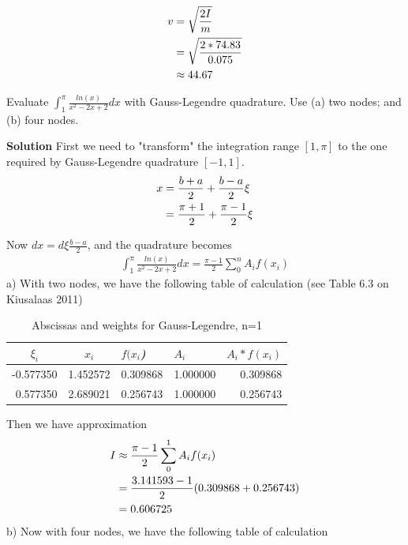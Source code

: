 \begin{exercise}{3}
 \begin{align}
 v&=\sqrt{\frac{2I}{m}} \notag \\
 &=\sqrt{\frac{2*74.83}{0.075}} \notag \\
 &\approx 44.67 \notag
 \end{align}
 \end{exercise}

\begin{exercise}{4} Evaluate $\int_1^\pi \frac{ln(x)}{x^2-2x+2}dx$
with Gauss-Legendre quadrature. Use (a) two nodes; and (b) four nodes.

\textbf{Solution}
First we need to "transform" the integration range \([1,\pi]\) to the one required by Gauss-Legendre quadrature \([-1,1]\).
\begin{align}
x&=\frac{b+a}{2} + \frac{b-a}{2}\xi \notag \\
&=\frac{\pi+1}{2} + \frac{\pi-1}{2}\xi \notag
\end{align}
\end{exercise}
Now \(dx = d\xi \frac{b-a}{2}\), and the quadrature becomes
\begin{align}
\int_1^\pi \frac{ln(x)}{x^2-2x+2}dx = \frac{\pi-1}{2} \sum_0^n A_if(x_i)
\end{align}
a) With two nodes, we have the following table of calculation (see Table 6.3 on Kiusalaas 2011)

\begin{table}[h]
\centering
\begin{tabular}{|r|r|r|r|r|}
\hline
\multicolumn{1}{|c|}{\textit{\textbf{\(\xi_i\)}}} & \multicolumn{1}{c|}{\textit{\textbf{\(x_i\)}}} & \multicolumn{1}{l|}{\textit{\(f(x_i\))}} & \multicolumn{1}{l|}{\textit{\(A_i\)}} & \multicolumn{1}{l|}{\textit{\(A_i*f(x_i)\)}} \\ \hline
-0.577350 & 1.452572 & 0.309868 & 1.000000 & 0.309868 \\ \hline
0.577350 & 2.689021 & 0.256743 & 1.000000 & 0.256743 \\ \hline
\end{tabular}
\caption{Abscissas and weights for Gauss-Legendre, n=1}
\label{tab-gauss-legendre-2-nodes}
\end{table}

Then we have approximation
\begin{align}
I&\approx\frac{\pi-1}{2} \sum_0^1 A_if(x_i) \notag \\
&=\frac{3.141593-1}{2} (0.309868+0.256743) \notag \\
&=0.606725 \notag
\end{align}
b) Now with four nodes, we have the following table of calculation

